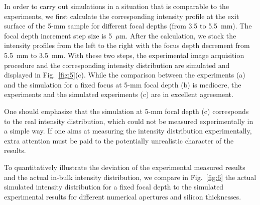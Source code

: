 \documentclass[9pt,twocolumn,twoside]{osajnl}
\begin{document}
In order to carry out simulations in a situation that is comparable to the experiments, we first calculate the corresponding intensity profile at the exit surface of the 5-mm sample for different focal depths (from 3.5 to 5.5~mm). The focal depth increment step size is 5~$\mu$m. After the calculation, we stack the intensity profiles from the left to the right with the focus depth decrement from 5.5~mm to 3.5~mm. With these two steps, the experimental image acquisition procedure and the corresponding intensity distribution are simulated and displayed in Fig.~\ref{fig:5}(c). While the comparison between the experiments (a) and the simulation for a fixed focus at 5-mm focal depth (b) is mediocre, the experiments and the simulated experiments (c) are in excellent agreement. %

One should emphasize that the simulation at 5-mm focal depth (c) corresponds to the real intensity distribution, which could not be measured experimentally in a simple way. If one aims at measuring the intensity distribution experimentally, extra attention must be paid to the potentially unrealistic character of the results.

To quantitatively illustrate the deviation of the experimental measured results and the actual in-bulk intensity distribution, we compare in Fig.~\ref{fig:6} the actual simulated intensity distribution for a fixed focal depth to the simulated experimental results for different numerical apertures and silicon thicknesses.
\end{document}
